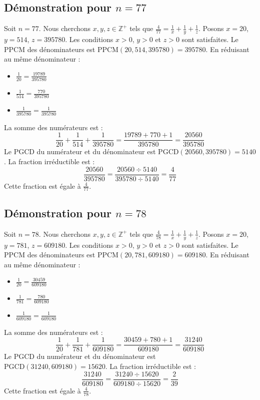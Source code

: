 \documentclass[11pt,a4paper]{article}
\begin{document}
\subsection{Démonstration pour $n = 77$}
Soit $n = 77$. Nous cherchons $x, y, z \in \mathbb{Z}^{+}$ tels que $\frac{4}{77} = \frac{1}{x} + \frac{1}{y} + \frac{1}{z}$.
Posons $x = 20$, $y = 514$, $z = 395780$.
Les conditions $x > 0$, $y > 0$ et $z > 0$ sont satisfaites.
Le PPCM des dénominateurs est $\text{PPCM}(20, 514, 395780) = 395780$.
En réduisant au même dénominateur :
\begin{itemize}
    \item $\frac{1}{20} = \frac{19789}{395780}$
    \item $\frac{1}{514} = \frac{770}{395780}$
    \item $\frac{1}{395780} = \frac{1}{395780}$
\end{itemize}
La somme des numérateurs est :
$$ \frac{1}{20} + \frac{1}{514} + \frac{1}{395780} = \frac{19789 + 770 + 1}{395780} = \frac{20560}{395780} $$
Le PGCD du numérateur et du dénominateur est $\text{PGCD}(20560, 395780) = 5140$.
La fraction irréductible est :
$$ \frac{20560}{395780} = \frac{20560 \div 5140}{395780 \div 5140} = \frac{4}{77} $$
Cette fraction est égale à $\frac{4}{77}$.

\subsection{Démonstration pour $n = 78$}
Soit $n = 78$. Nous cherchons $x, y, z \in \mathbb{Z}^{+}$ tels que $\frac{4}{78} = \frac{1}{x} + \frac{1}{y} + \frac{1}{z}$.
Posons $x = 20$, $y = 781$, $z = 609180$.
Les conditions $x > 0$, $y > 0$ et $z > 0$ sont satisfaites.
Le PPCM des dénominateurs est $\text{PPCM}(20, 781, 609180) = 609180$.
En réduisant au même dénominateur :
\begin{itemize}
    \item $\frac{1}{20} = \frac{30459}{609180}$
    \item $\frac{1}{781} = \frac{780}{609180}$
    \item $\frac{1}{609180} = \frac{1}{609180}$
\end{itemize}
La somme des numérateurs est :
$$ \frac{1}{20} + \frac{1}{781} + \frac{1}{609180} = \frac{30459 + 780 + 1}{609180} = \frac{31240}{609180} $$
Le PGCD du numérateur et du dénominateur est $\text{PGCD}(31240, 609180) = 15620$.
La fraction irréductible est :
$$ \frac{31240}{609180} = \frac{31240 \div 15620}{609180 \div 15620} = \frac{2}{39} $$
Cette fraction est égale à $\frac{4}{78}$.
\end{document}
